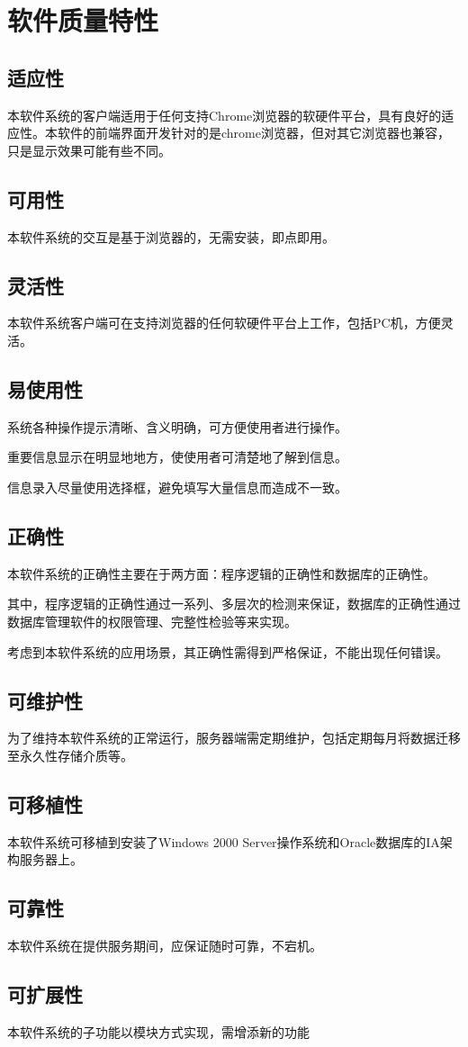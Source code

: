 \chapter{软件质量特性}

\section{适应性}
本软件系统的客户端适用于任何支持Chrome浏览器的软硬件平台，具有良好的适应性。本软件的前端界面开发针对的是chrome浏览器，但对其它浏览器也兼容，只是显示效果可能有些不同。
\section{可用性}
本软件系统的交互是基于浏览器的，无需安装，即点即用。
\section{灵活性}
本软件系统客户端可在支持浏览器的任何软硬件平台上工作，包括PC机，方便灵活。
\section{易使用性}
系统各种操作提示清晰、含义明确，可方便使用者进行操作。

重要信息显示在明显地地方，使使用者可清楚地了解到信息。

信息录入尽量使用选择框，避免填写大量信息而造成不一致。

\section{正确性}
本软件系统的正确性主要在于两方面：程序逻辑的正确性和数据库的正确性。

其中，程序逻辑的正确性通过一系列、多层次的检测来保证，数据库的正确性通过数据库管理软件的权限管理、完整性检验等来实现。

考虑到本软件系统的应用场景，其正确性需得到严格保证，不能出现任何错误。

\section{可维护性}
为了维持本软件系统的正常运行，服务器端需定期维护，包括定期每月将数据迁移至永久性存储介质等。

\section{可移植性}
本软件系统可移植到安装了Windows 2000 Server操作系统和Oracle数据库的IA架构服务器上。
\section{可靠性}
本软件系统在提供服务期间，应保证随时可靠，不宕机。
\section{可扩展性}
本软件系统的子功能以模块方式实现，需增添新的功能